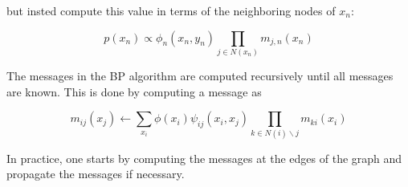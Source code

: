 \documentclass[11pt]{article}
\begin{document}
but insted compute this value in terms of the neighboring nodes of $x_n$:

\begin{equation*}
	p(x_n) \propto \phi_n(x_n, y_n) \prod_{j \in N(x_n)} m_{j,n}(x_n)
\end{equation*}

The messages in the BP algorithm are computed recursively until all messages are known. This is done by computing a message as

\begin{equation*}
	m_{ij}(x_j) \leftarrow \sum_{x_i} \phi(x_i) \psi_{ij}(x_i, x_j) \prod_{k \in N(i) \backslash j} m_{ki}(x_i)
\end{equation*}

In practice, one starts by computing the messages at the edges of the graph and propagate the messages if necessary.
\end{document}
